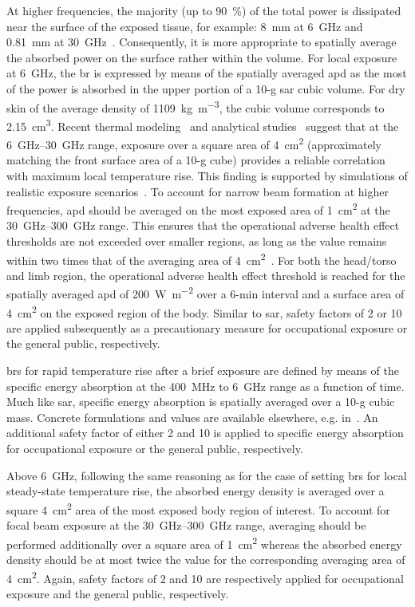 At higher frequencies, the majority (up to \SI{90}{\percent}) of the total power is dissipated near the surface of the exposed tissue, for example: \SI{8}{\mm} at \SI{6}{\GHz} and \SI{0.81}{\mm} at \SI{30}{\GHz}~\cite{Sasaki2017Monte}.
Consequently, it is more appropriate to spatially average the absorbed power on the surface rather within the volume.
For local exposure at \SI{6}{\GHz}, the \gls{br} is expressed by means of the spatially averaged \gls{apd} as the most of the power is absorbed in the upper portion of a 10-g \gls{sar} cubic volume.
For dry skin of the average density of \SI{1109}{\kg\per\m\cubed}, the cubic volume corresponds to \SI{2.15}{\cm\cubed}.
Recent thermal modeling~\cite{Hashimoto2017averaging} and analytical studies~\cite{Foster2017Thermal} suggest that at the \SIrange{6}{30}{\GHz} range, exposure over a square area of \SI{4}{\cm\squared} (approximately matching the front surface area of a 10-g cube) provides a reliable correlation with maximum local temperature rise.
This finding is supported by simulations of realistic exposure scenarios~\cite{He2018RF}.
To account for narrow beam formation at higher frequencies, \gls{apd} should be averaged on the most exposed area of \SI{1}{\cm\squared} at the \SIrange{30}{300}{\GHz} range.
This ensures that the operational adverse health effect thresholds are not exceeded over smaller regions, as long as the value remains within two times that of the averaging area of \SI{4}{\cm\squared}~\cite{Foster2016Thermal}.
For both the head/torso and limb region, the operational adverse health effect threshold is reached for the spatially averaged \gls{apd} of \SI{200}{\W\per\m\squared} over a 6-min interval and a surface area of \SI{4}{\cm\squared} on the exposed region of the body.
Similar to \gls{sar}, safety factors of \num{2} or \num{10} are applied subsequently as a precautionary measure for occupational exposure or the general public, respectively.

\Gls{br}s for rapid temperature rise after a brief exposure are defined by means of the specific energy absorption at the \SI{400}{\MHz} to \SI{6}{\GHz} range as a function of time.
Much like \gls{sar}, specific energy absorption is spatially averaged over a 10-g cubic mass.
Concrete formulations and values are available elsewhere, e.g. in~\cite{ICNIRP2020Guidelines,IEEE2019Standard}.
An additional safety factor of either \num{2} and \num{10} is applied to specific energy absorption for occupational exposure or the general public, respectively.

Above \SI{6}{\GHz}, following the same reasoning as for the case of setting \gls{br}s for local steady-state temperature rise, the absorbed energy density is averaged over a square \SI{4}{\cm\squared} area of the most exposed body region of interest.
To account for focal beam exposure at the \SIrange{30}{300}{\GHz} range, averaging should be performed additionally over a square area of \SI{1}{\cm\squared} whereas the absorbed energy density should be at most twice the value for the corresponding averaging area of \SI{4}{\cm\squared}.
Again, safety factors of \num{2} and \num{10} are respectively applied for occupational exposure and the general public, respectively.

